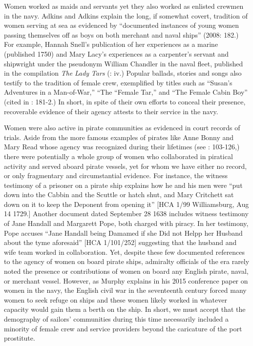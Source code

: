   Women worked as maids and servants yet they also worked as enlisted crewmen in the navy. Adkins and Adkins explain the long, if somewhat covert, tradition of women serving at sea as evidenced by “documented instances of young women passing themselves off as boys on both merchant and naval ships” (2008: 182.) For example, Hannah Snell’s publication of her experiences as a marine (published 1750) and Mary Lacy’s experiences as a carpenter’s servant and shipwright under the pseudonym William Chandler in the naval fleet, published in the compilation \textit{The} \textit{Lady} \textit{Tars} (\citealt{SnellEtAl2008}: iv.) Popular ballads, stories and songs also testify to the tradition of female crew, exemplified by titles such as “Susan’s Adventures in a Man-of-War,” “The “Female Tar,” and “The Female Cabin Boy” (cited in \citealt{AdkinsAdkins2008}: 181-2.) In short, in spite of their own efforts to conceal their presence, recoverable evidence of their agency attests to their service in the navy. 

Women were also active in pirate communities as evidenced in court records of trials. Aside from the more famous examples of pirates like Anne Bonny and Mary Read whose agency was recognized during their lifetimes (see \citealt{Rediker2004}: 103-126,) there were potentially a whole group of women who collaborated in piratical activity and served aboard pirate vessels, yet for whom we have either no record, or only fragmentary and circumstantial evidence. For instance, the witness testimony of a prisoner on a pirate ship explains how he and his men were “put down into the Cabbin and the Scuttle or hatch shut, and Mary Critchett sat down on it to keep the Deponent from opening it” [HCA 1/99 Williamsburg, Aug 14 1729.] Another document dated September 28 1638 includes witness testimony of Jane Handall and Margarett Pope, both charged with piracy. In her testimony, Pope accuses “Jane Handall being Damamed if she Did not Helpp her Husband about the tyme aforesaid” [HCA 1/101/252] suggesting that the husband and wife team worked in collaboration. Yet, despite these few documented references to the agency of women on board pirate ships, admiralty officials of the era rarely noted the presence or contributions of women on board any English pirate, naval, or merchant vessel. However, as Murphy explains in his 2015 conference paper on women in the navy, the English civil war in the seventeenth century forced many women to seek refuge on ships and these women likely worked in whatever capacity would gain them a berth on the ship. In short, we must accept that the demography of sailors’ communities during this time necessarily included a minority of female crew and service providers beyond the caricature of the port prostitute. 

